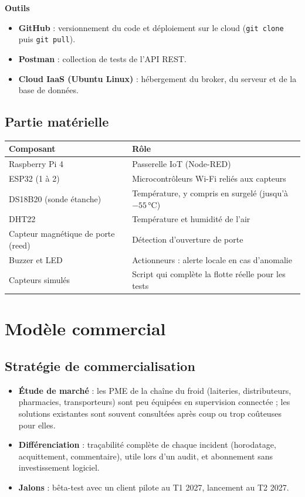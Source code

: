 \documentclass[11pt,a4paper]{article}
\let\oldsection\section
\renewcommand{\section}{\Needspace{10\baselineskip}\oldsection}
\newcommand{\tete}[1]{\textbf{#1}}
\begin{document}
\textbf{Outils}
\begin{itemize}
  \item \textbf{GitHub} : versionnement du code et déploiement sur le cloud (\texttt{git clone} puis \texttt{git pull}).
  \item \textbf{Postman} : collection de tests de l'API REST.
  \item \textbf{Cloud IaaS (Ubuntu Linux)} : hébergement du broker, du serveur et de la base de données.
\end{itemize}

\subsection{Partie matérielle}
\begin{tabularx}{\textwidth}{@{}l L@{}}
\toprule
\tete{Composant} & \tete{Rôle} \\
\midrule
Raspberry Pi 4 & Passerelle IoT (Node-RED) \\
ESP32 (1 à 2) & Microcontrôleurs Wi-Fi reliés aux capteurs \\
DS18B20 (sonde étanche) & Température, y compris en surgelé (jusqu'à $-55$\,°C) \\
DHT22 & Température et humidité de l'air \\
Capteur magnétique de porte (reed) & Détection d'ouverture de porte \\
Buzzer et LED & Actionneurs : alerte locale en cas d'anomalie \\
Capteurs simulés & Script qui complète la flotte réelle pour les tests \\
\bottomrule
\end{tabularx}

\section{Modèle commercial}

\subsection{Stratégie de commercialisation}
\begin{itemize}
  \item \textbf{Étude de marché} : les PME de la chaîne du froid (laiteries, distributeurs,
        pharmacies, transporteurs) sont peu équipées en supervision connectée ; les solutions
        existantes sont souvent consultées après coup ou trop coûteuses pour elles.
  \item \textbf{Différenciation} : traçabilité complète de chaque incident (horodatage,
        acquittement, commentaire), utile lors d'un audit, et abonnement sans investissement logiciel.
  \item \textbf{Jalons} : bêta-test avec un client pilote au T1 2027, lancement au T2 2027.
\end{itemize}
\end{document}

